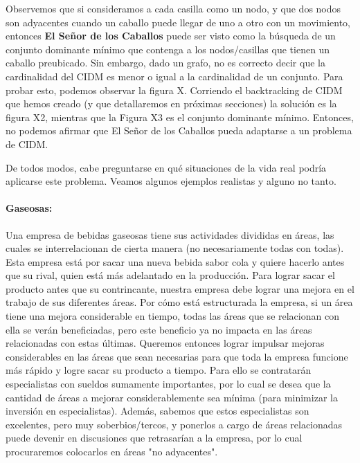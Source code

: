 \documentclass[a4paper]{article}
\begin{document}
\vspace*{0.1cm}

Observemos que si consideramos a cada casilla como un nodo, y que dos nodos son adyacentes cuando un caballo puede llegar de uno a otro con un movimiento, entonces {\bf El Señor de los Caballos} puede ser visto como la búsqueda de un conjunto dominante mínimo que contenga a los nodos/casillas que tienen un caballo preubicado. Sin embargo, dado un grafo, no es correcto decir que la cardinalidad del CIDM es menor o igual a la cardinalidad de un conjunto. Para probar esto, podemos observar la figura X. Corriendo el backtracking de CIDM que hemos creado (y que detallaremos en próximas secciones) la solución es la figura X2, mientras que la Figura X3 es el conjunto dominante mínimo. Entonces, no podemos afirmar que El Señor de los Caballos pueda adaptarse a un problema de CIDM. 

\vspace*{0.1cm}

De todos modos, cabe preguntarse en qué situaciones de la vida real podría aplicarse este problema. Veamos algunos ejemplos realistas y alguno no tanto.


\paragraph{Gaseosas:} Una empresa de bebidas gaseosas tiene sus actividades divididas en áreas, las cuales se interrelacionan de cierta manera (no necesariamente todas con todas).  Esta empresa está por sacar una nueva bebida sabor cola y quiere hacerlo antes que su rival, quien está más adelantado en la producción.  Para lograr sacar el producto antes que su contrincante, nuestra empresa debe lograr una mejora en el trabajo de sus diferentes áreas.  Por cómo está estructurada la empresa, si un área tiene una mejora considerable en tiempo, todas las áreas que se relacionan con ella se verán beneficiadas, pero este beneficio ya no impacta en las áreas relacionadas con estas últimas.  Queremos entonces lograr impulsar mejoras considerables en las áreas que sean necesarias para que toda la empresa funcione más rápido y logre sacar su producto a tiempo.  Para ello se contratarán especialistas con sueldos sumamente importantes, por lo cual se desea que la cantidad de áreas a mejorar considerablemente sea mínima (para minimizar la inversión en especialistas).  Además, sabemos que estos especialistas son excelentes, pero muy soberbios/tercos, y ponerlos a cargo de áreas relacionadas puede devenir en discusiones que retrasarían a la empresa, por lo cual procuraremos colocarlos en áreas "no adyacentes".
\end{document}
